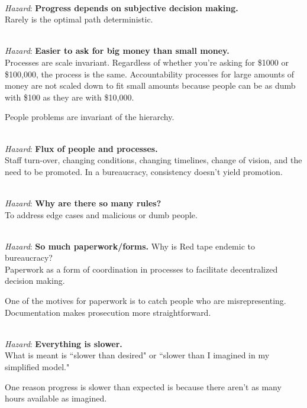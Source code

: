 \ \\

\textit{Hazard}: \textbf{Progress depends on subjective decision making.}\\
Rarely is the optimal path deterministic. 

\ \\

\textit{Hazard}: \textbf{Easier to ask for big money than small money.}\\
Processes are scale invariant. Regardless of whether you're asking for \$1000 or \$100,000, the process is the same. Accountability processes for large amounts of money are not scaled down to fit small amounts because people can be as dumb with \$100 as they are with \$10,000.


People problems are invariant of the hierarchy.


\ \\

\textit{Hazard}: \textbf{Flux of people and processes.} \\
Staff turn-over, changing conditions, changing timelines, change of vision, and the need to be promoted. In a bureaucracy, consistency doesn't yield promotion.

\ \\

\textit{Hazard}: \textbf{Why are there so many rules?}\\
To address edge cases and malicious or dumb people.

\ \\

\textit{Hazard}: \textbf{So much paperwork/forms.}
Why is Red tape endemic to bureaucracy?\\
Paperwork as a form of coordination in processes to facilitate decentralized decision making. 

One of the motives for paperwork is to catch people who are misrepresenting. Documentation makes prosecution more straightforward.

\ \\

\textit{Hazard}: \textbf{Everything is slower.}\\
What is meant is ``slower than desired" or ``slower than I imagined in my simplified model."

One reason progress is slower than expected is because there aren't as many hours available as imagined.


